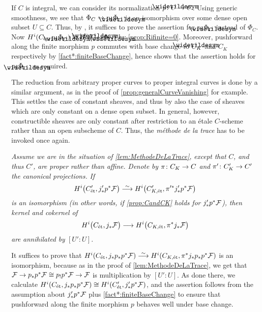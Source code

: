\begin{proof*}
\begin{numerate}
	\end{numerate}
	If $C$ is integral, we can consider its normalization $p\colon \snake{C}\morphism C$. Using generic smoothness, we see that $\Phi_C\morphism p_*\Phi_{\snake{C}}$ is an isomorphism over some dense open subset $U\subseteq C$. Thus, by , it suffices to prove the assertion for $p_*\Phi_{\snake{C}}$ instead of $\Phi_C$. Now $H^i(C_\et,p_*\Phi_{\snake{C}})\cong H^i(\snake{C}_\et,\Phi_{\snake{C}})$ by \cref{prop:Rifinite=0}. Moreover, pushforward along the finite morphism $p$ commutes with base change to $\snake{C}_K$ and $C_K$ respectively by \cref{fact*:finiteBaseChange}, hence  shows that the assertion holds for $p_*\Phi_{\snake{C}}$, as required.
	
	The reduction from arbitrary proper curves to proper integral curves is done by a similar argument, as in the proof of \cref{prop:generalCurveVanishing} for example. This settles the case of constant sheaves, and thus by  also the case of sheaves which are only constant on a dense open subset. In general, however, constructible sheaves are only constant after restriction to an étale $C$-scheme rather than an open subscheme of $C$. Thus, the \emph{méthode de la trace} has to be invoked once again.
	\begin{numerate}
		\item[\itememph{4}] \itshape Assume we are in the situation of \cref{lem:MethodeDeLaTrace}, except that $C$, and thus $C'$, are proper rather than affine. Denote by $\pi\colon C_K\morphism C$ and $\pi'\colon C_K'\morphism C'$ the canonical projections. If
		\begin{equation*}
			H^i\big(C'_\et,j'_*p^*\Ff\big)\isomorphism H^i\big(C'_{K,\et},\pi'^*j'_*p^*\Ff\big)
		\end{equation*}
		is an isomorphism (in other words, if \cref{prop:CandCK} holds for $j'_*p^*\mathcal{F}$), then kernel and cokernel of
		\begin{equation*}
			H^i\big(C_\et,j_*\Ff\big)\morphism H^i\big(C_{K,\et},\pi^*j_*\Ff\big)
		\end{equation*}
		are annihilated by $[U':U]$.
	\end{numerate}
	It suffices to prove that $H^i(C_\et,j_*p_*p^*\Ff)\isomorphism H^i(C_{K,\et},\pi^*j_*p_*p^*\Ff)$ is an isomorphism, because as in the proof of \cref{lem:MethodeDeLaTrace}, we get that $\Ff\morphism p_*p^*\Ff\cong p_!p^*\Ff\morphism \Ff$ is multiplication by $[U':U]$. As done there, we calculate $H^i(C_{\mathrm{\acute{e}t}},j_*p_*p^*\mathcal{F})\cong H^i(C'_{\mathrm{\acute{e}t}},j'_*p^*\mathcal{F})$, and the assertion follows from the assumption about $j'_*p^*\mathcal{F}$ plus \cref{fact*:finiteBaseChange} to ensure that pushforward along the finite morphism $p$ behaves well under base change.

\end{proof*}
